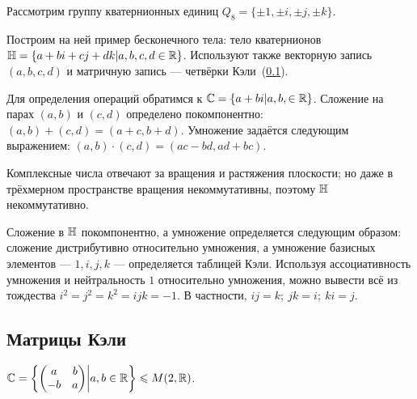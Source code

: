 \documentclass[a4paper]{report}
\begin{document}
    Рассмотрим группу кватернионных единиц $Q_8 = \{\pm1, \pm i, \pm j, \pm k\}$.

    Построим на ней пример бесконечного тела: тело кватернионов $\mathbb{H} = \left\{a + bi + cj + dk\middle|a, b, c, d \in \mathbb{R}\right\}$.
    Используют также векторную запись $(a, b, c, d)$ и матричную запись --- четвёрки Кэли~(\ref{subsec:cayley_matrices}).

    Для определения операций обратимся к $\mathbb{C} = \left\{a + bi\middle|a, b, \in \mathbb{R}\right\}$.
    Сложение на парах $(a, b)$ и $(c, d)$ определено покомпонентно: $(a, b) + (c, d) = (a + c, b + d)$.
    Умножение задаётся следующим выражением: $(a, b) \cdot (c, d) = (ac - bd, ad + bc)$.

    Комплексные числа отвечают за вращения и растяжения плоскости;
    но даже в трёхмерном пространстве вращения некоммутативны, поэтому $\mathbb{H}$ некоммутативно.

    Сложение в $\mathbb{H}$ покомпонентно, а умножение определяется следующим образом: сложение дистрибутивно относительно умножения, а умножение базисных элементов --- $1, i, j, k$ --- определяется таблицей Кэли.
    Используя ассоциативность умножения и нейтральность $1$ относительно умножения, можно вывести всё из тождества $i^2 = j^2 = k^2 = ijk = -1$.
    В частности, $ij = k; ~jk = i; ~ ki = j$.


    \subsection{Матрицы Кэли}
    \label{subsec:cayley_matrices}
    $\mathbb{C} = \left\{\begin{pmatrix}a&b\\-b&a\end{pmatrix}\middle|a, b \in \mathbb{R}\right\} \leqslant M(2, \mathbb{R})$.
\end{document}
